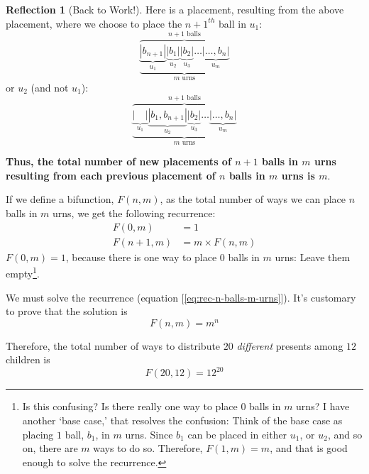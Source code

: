 \documentclass[11pt]{book}
\theoremstyle{definition}
\theoremstyle{plain}
\theoremstyle{definition}
\theoremstyle{problemstyle}
\theoremstyle{remark}
\theoremstyle{definition}
\newtheorem{reflection}{Reflection}
\begin{document}
\begin{reflection}[Back to Work!]
    Here is a placement, resulting from the above placement, where we choose to place the $n+1^{th}$ ball in $u_1$:
    \[
        \overbrace{
            \underbrace{\underbrace{|b_{n+1}|}_{u_1}\underbrace{|b_1|}_{u_2}\underbrace{|b_2|}_{u_3}\dots\underbrace{|\dots,b_n|}_{u_m}}_{m\text{ urns}}
    }^{n+1\text{ balls}}
    \]
    or $u_2$ (and not $u_1$):
    \[
        \overbrace{
            \underbrace{\underbrace{|\quad|}_{u_1}\underbrace{|b_1,b_{n+1}|}_{u_2}\underbrace{|b_2|}_{u_3}\dots\underbrace{|\dots,b_n|}_{u_m}}_{m\text{ urns}}
    }^{n+1\text{ balls}}
    \]

    \textbf{Thus, the total number of new placements of $n+1$ balls in $m$ urns resulting from each previous placement of $n$ balls in $m$ urns is $m$}.

    If we define a bifunction, $F(n,m)$, as the total number of ways we can place $n$ balls in $m$ urns, we get the following recurrence:
    \begin{align}
        F(0,m)&=1\nonumber\\
        F(n+1,m)&=m\times F(n,m)
        \label{eq:rec-n-balls-m-urns}
    \end{align}
    $F(0,m)=1$, because there is one way to place $0$ balls in $m$ urns: Leave them empty\footnote{Is this confusing? Is there really one way to place $0$ balls in $m$ urns? I have another `base case,' that resolves the confusion: Think of the base case as placing $1$ ball, $b_1$, in $m$ urns. Since $b_1$ can be placed in either $u_1$, or $u_2$, and so on, there are $m$ ways to do so. Therefore, $F(1,m)=m$, and that is good enough to solve the recurrence.}.

    We must solve the recurrence (equation [\ref{eq:rec-n-balls-m-urns}]). It's customary to prove that the solution is
    \[
        F(n,m)=m^n
    \]

    Therefore, the total number of ways to distribute $20$ \emph{different} presents among $12$ children is 
    \[
        F(20,12)=12^{20}
    \]
    \label{ref:n-balls-m-urns}
\end{reflection}
\end{document}
